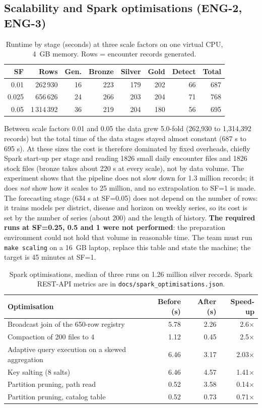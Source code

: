 \documentclass[conference]{IEEEtran}
\begin{document}
\subsection{Scalability and Spark optimisations (ENG-2, ENG-3)}
\begin{table}[t]\caption{Runtime by stage (seconds) at three scale factors on one virtual CPU, 4~GB memory. Rows = encounter records generated.}\label{tab:scale}\centering\footnotesize
\begin{tabular}{@{}rrrrrrrr@{}}\toprule SF & Rows & Gen. & Bronze & Silver & Gold & Detect & Total \\\midrule
0.01 & 262\,930 & 16 & 223 & 179 & 202 & 66 & 687 \\
0.025 & 656\,626 & 24 & 266 & 203 & 204 & 71 & 768 \\
0.05 & 1\,314\,392 & 36 & 219 & 204 & 180 & 56 & 695 \\
\bottomrule\end{tabular}\end{table}
Between scale factors 0.01 and 0.05 the data grew 5.0-fold (262,930 to 1,314,392 records) but the total time of the data stages stayed almost constant (687 s to 695 s). At these sizes the cost is therefore dominated by fixed overheads, chiefly Spark start-up per stage and reading 1826 small daily encounter files and 1826 stock files (bronze takes about 220 s at every scale), not by data volume. The experiment shows that the pipeline does not slow down for 1.3 million records; it does \emph{not} show how it scales to 25 million, and no extrapolation to SF=1 is made. The forecasting stage (634 s at SF=0.05) does not depend on the number of rows: it trains models per district, disease and horizon on weekly series, so its cost is set by the number of series (about 200) and the length of history. \textbf{The required runs at SF=0.25, 0.5 and 1 were not performed}: the preparation environment could not hold that volume in reasonable time. The team must run \texttt{make scaling} on a 16~GB laptop, replace this table and state the machine; the target is 45 minutes at SF=1.
\begin{table}[t]\caption{Spark optimisations, median of three runs on 1.26 million silver records. Spark REST-API metrics are in \texttt{docs/spark\_optimisations.json}.}\label{tab:opt}\centering\footnotesize
\begin{tabularx}{\columnwidth}{@{}Xrrr@{}}\toprule Optimisation & Before (s) & After (s) & Speed-up \\\midrule
Broadcast join of the 650-row registry & 5.78 & 2.26 & 2.6$\times$ \\
Compaction of 200 files to 4 & 1.12 & 0.45 & 2.5$\times$ \\
Adaptive query execution on a skewed aggregation & 6.46 & 3.17 & 2.03$\times$ \\
Key salting (8 salts) & 6.46 & 4.57 & 1.41$\times$ \\
Partition pruning, path read & 0.52 & 3.58 & 0.14$\times$ \\
Partition pruning, catalog table & 0.52 & 0.73 & 0.71$\times$ \\
\bottomrule\end{tabularx}\end{table}
\end{document}
